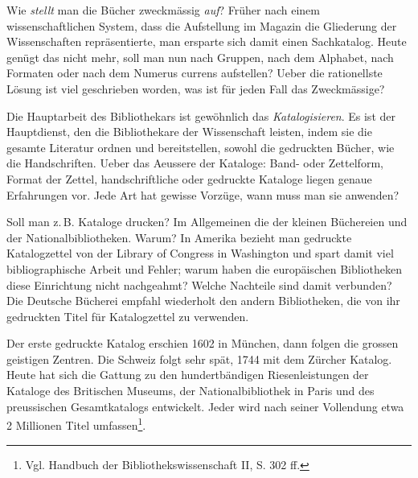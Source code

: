 \documentclass[a4paper,
fontsize=11pt,
oneside,
numbers=noperiodatend,
parskip=half-,
bibliography=totoc,
final
]{scrartcl}
\begin{document}
Wie \emph{stellt} man die Bücher zweckmässig \emph{auf}? Früher nach
einem wissenschaftlichen System, dass die Aufstellung im Magazin die
Gliederung der Wissenschaften repräsentierte, man ersparte sich damit
einen Sachkatalog. Heute genügt das nicht mehr, soll man nun nach
Gruppen, nach dem Alphabet, nach Formaten oder nach dem Numerus currens
aufstellen? Ueber die rationellste Lösung ist viel geschrieben worden,
was ist für jeden Fall das Zweckmässige?

Die Hauptarbeit des Bibliothekars ist gewöhnlich das
\emph{Katalogisieren}. Es ist der Hauptdienst, den die Bibliothekare der
Wissenschaft leisten, indem sie die gesamte Literatur ordnen und
bereitstellen, sowohl die gedruckten Bücher, wie die Handschriften.
Ueber das Aeussere der Kataloge: Band- oder Zettelform, Format der
Zettel, handschriftliche oder gedruckte Kataloge liegen genaue
Erfahrungen vor. Jede Art hat gewisse Vorzüge, wann muss man sie
anwenden?

Soll man z.\,B. Kataloge drucken? Im Allgemeinen die der kleinen
Büchereien und der Nationalbibliotheken. Warum? In Amerika bezieht man
gedruckte Katalogzettel von der Library of Congress in Washington und
spart damit viel bibliographische Arbeit und Fehler; warum haben die
europäischen Bibliotheken diese Einrichtung nicht nachgeahmt? Welche
Nachteile sind damit verbunden? Die Deutsche Bücherei empfahl wiederholt
den andern Bibliotheken, die von ihr gedruckten Titel für Katalogzettel
zu verwenden.

Der erste gedruckte Katalog erschien 1602 in München, dann folgen die
grossen geistigen Zentren. Die Schweiz folgt sehr spät, 1744 mit dem
Zürcher Katalog. Heute hat sich die Gattung zu den hundertbändigen
Riesenleistungen der Kataloge des Britischen Museums, der
Nationalbibliothek in Paris und des preussischen Gesamtkatalogs
entwickelt. Jeder wird nach seiner Vollendung etwa 2 Millionen Titel
umfassen\footnote{Vgl. Handbuch der Bibliothekswissenschaft II, S. 302
  ff.}.
\end{document}

